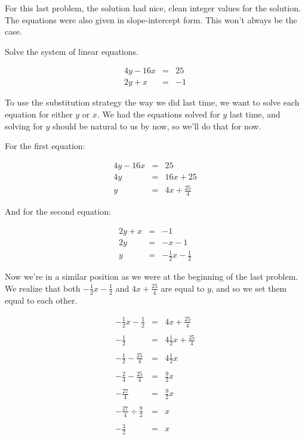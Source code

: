 \pagebreak

For this last problem, the solution had nice, clean integer values for the solution.  The equations were also given in slope-intercept form.  This won't always be the case.

\begin{example}
Solve the system of linear equations.

$$\begin{array}{rcl}
4y - 16x & = & 25 \\
2y + x & = & -1 \end{array}$$

To use the substitution strategy the way we did last time, we want to solve each equation for either $y$ or $x$.  We had the equations solved for $y$ last time, and solving for $y$ should be natural to us by now, so we'll do that for now.

For the first equation:

$$\begin{array}{rcl}
4y - 16x & = & 25 \\
4y & = & 16x + 25 \\
y & = & 4x + \frac{25}{4} \end{array}$$

And for the second equation:

$$\begin{array}{rcl}
2y + x & = & -1 \\
2y & = & -x -1 \\
y & = & -\frac{1}{2}x - \frac{1}{2} \end{array}$$

Now we're in a similar position as we were at the beginning of the last problem.  We realize that both $-\frac{1}{2}x - \frac{1}{2}$ and $4x + \frac{25}{4}$ are equal to $y$, and so we set them equal to each other.

$$\begin{array}{rcl}
-\frac{1}{2}x - \frac{1}{2} & = & 4x + \frac{25}{4}\\ \\
-\frac{1}{2} & = & 4\frac{1}{2}x + \frac{25}{4}\\ \\
-\frac{1}{2} - \frac{25}{4} & = & 4\frac{1}{2}x\\ \\
-\frac{2}{4} - \frac{25}{4} & = & \frac{9}{2}x\\ \\
-\frac{27}{4} & = & \frac{9}{2}x\\ \\
-\frac{27}{4} \div \frac{9}{2}& = & x \\ \\
-\frac{3}{2} & = & x\\
\end{array}$$


\end{example}
